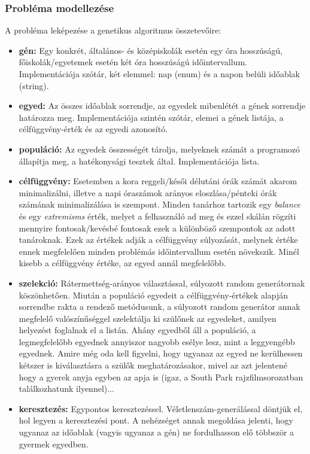 \documentclass[12pt,a4paper]{report}
\begin{document}
\subsubsection{Probléma modellezése}

\noindent A probléma leképezése a genetikus algoritmus összetevőire:

\begin{itemize}
    \item \textbf{gén:} Egy konkrét, általános- és középiskolák esetén egy óra hosszúságú, 	          főiskolák/egyetemek esetén két óra hosszúságú időintervallum. Implementációja szótár, két elemmel: nap (enum) és a napon belüli időablak (string).
    \item \textbf{egyed:} Az összes időablak sorrendje, az egyedek mibenlétét a gének sorrendje határozza meg. Implementációja szintén szótár, elemei a gének listája, a célfüggvény-érték és az
egyedi azonosító.
    \item \textbf{populáció:} Az egyedek összességét tárolja, melyeknek számát a programozó állapítja meg, a hatékonysági tesztek által. Implementációja lista.
    \item \textbf{célfüggvény:} Esetemben a kora reggeli/késői délutáni órák számát akarom minimalizálni, illetve a napi óraszámok arányos eloszlása/pénteki órák számának minimalizálása is szempont. Minden tanárhoz tartozik egy \textsl{balance} és egy \textsl{extremisms} érték,
melyet a felhasználó ad meg és ezzel skálán rögzíti mennyire fontosak/kevésbé fontosak ezek a különböző szempontok az adott tanároknak. Ezek az értékek adják a célfüggvény súlyozását, melynek értéke ennek megfelelően minden problémás időintervallum esetén növekszik. Minél kisebb a célfüggvény értéke, az egyed annál megfelelőbb.
    \item \textbf{szelekció:} Rátermettség-arányos választással, súlyozott random generátornak köszönhetően. Miután a populáció egyedeit a célfüggvény-értékek alapján sorrendbe rakta a rendező metódusunk, a súlyozott random generátor annak megfelelő valószínűséggel szelektálja ki szülőnek az egyedeket, amilyen helyezést foglalnak el a listán. Ahány egyedből áll a populáció, a legmegfelelőbb egyednek annyiszor nagyobb esélye lesz, mint a leggyengébb egyednek. Amire még oda kell figyelni, hogy ugyanaz az egyed ne kerülhessen kétszer is kiválasztásra a szülők meghatározásakor, mivel az azt jelentené hogy a gyerek anyja egyben az apja is (igaz, a South Park rajzfilmsorozatban találkozhatunk ilyennel)...
    \item \textbf{keresztezés:} Egypontos keresztezéssel. Véletlenszám-generálással döntjük el, hol legyen a keresztezési pont. A nehézséget annak megoldása jelenti, hogy ugyanaz az időablak (vagyis ugyanaz a gén) ne fordulhasson elő többször a gyermek egyedben.
\end{itemize}
\end{document}
